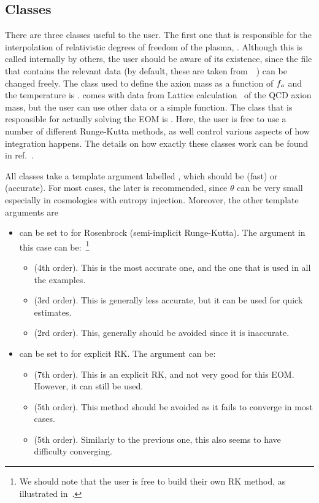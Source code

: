 \documentclass[a4paper,11pt]{article}
\begin{document}
	\subsection{Classes}
	There are three classes useful to the user. The first one that is responsible for the interpolation of relativistic degrees of freedom of the plasma, .
	Although this is called internally  by others, the user should be aware of its existence, since the file that contains the relevant data (by default, these are taken from~~\cite{Saikawa:2020swg})  can be changed freely. The class used to define the axion mass as a function of $f_{a}{}$ and the temperature is .  
	\mimes comes with data from Lattice calculation~\cite{Borsanyi:2016ksw} of the QCD axion mass, but the user can use other data or a simple function.
	The class that is responsible for actually solving the EOM is . Here, the user is free to use a number of different Runge-Kutta methods,
	as well control various aspects of how integration happens. The details on how exactly these classes work can be found in ref.~\cite{Karamitros:2021nxi}.
	
	All classes take a template argument labelled , which should be  (fast) or  (accurate). For most cases, the later is
	recommended, since $\theta$ can be very small especially in cosmologies with entropy injection. Moreover, the other template arguments are
	\begin{itemize}
		\item {} can be set to  for Rosenbrock (semi-implicit Runge-Kutta). 
		The  argument in this case can be:~\footnote{We should note that the user is free to build their own RK method, as illustrated in~\cite{Karamitros:2021nxi}.}
		\begin{itemize}
			\item {} (4th order). This is the most accurate one, and the one that is used in all the examples.
			\item {} (3rd order). This is generally less accurate, but it can be used for quick estimates.
			\item {} (2rd order). This, generally should be avoided since it is inaccurate.
		\end{itemize}
		\item {} can be set to  for explicit RK.
		The  argument can be:
		\begin{itemize}
			\item {} (7th order). This is an explicit RK, and not very good for this EOM. However, it can still be used.
			\item {} (5th order). This method should be avoided as it fails to converge in most cases.
			\item {} (5th order). Similarly to the previous one, this also seems to have difficulty converging.
		\end{itemize}	
	\end{itemize}
	
\end{document}
